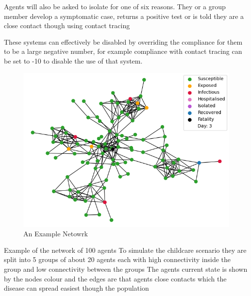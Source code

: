 \documentclass{article}
\begin{document}
Agents will also be asked to isolate for one of six reasons. They or a group member develop a symptomatic case, returns a positive test or is told they are a close contact though using contact tracing

These systems can effectively be disabled by overriding the compliance for them to be a large negative number, for example compliance with contact tracing can be set to -10 to disable the use of that system.

\begin{figure}
  \centering
      \includegraphics[width=\textwidth]{network}
  \caption{An Example Netowrk}
\end{figure}



Example of the network of 100 agents
To simulate the childcare scenario they are split into 5 groups of about 20 agents each with high connectivity inside the group and low connectivity between the groups 
The agents current state is shown by the nodes colour and the edges are that agents close contacts which the disease can spread easiest though the population
\end{document}
